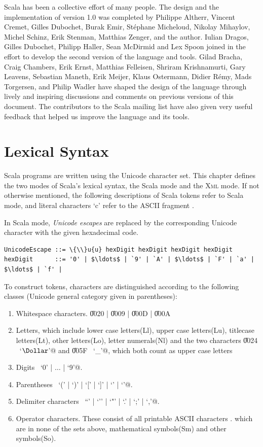 Scala has been a collective effort of many people. The design and the
implementation of version 1.0 was completed by Philippe Altherr,
Vincent Cremet, Gilles Dubochet, Burak Emir, St\'ephane Micheloud,
Nikolay Mihaylov, Michel Schinz, Erik Stenman, Matthias Zenger, and
the author. Iulian Dragos, Gilles Dubochet, Philipp Haller, Sean McDirmid
and Lex Spoon joined in the effort to develop the second version of the
language and tools.  Gilad Bracha, Craig Chambers, Erik Ernst,
Matthias Felleisen, Shriram Krishnamurti, Gary Leavens, Sebastian
Maneth, Erik Meijer, Klaus Ostermann, Didier R\'emy, Mads Torgersen, and Philip Wadler
have shaped the design of the language through lively and inspiring
discussions and comments on previous versions of this document.  The
contributors to the Scala mailing list have also given very useful
feedback that helped us improve the language and its tools.

\chapter{Lexical Syntax}

Scala programs are written using the Unicode character set.
This chapter defines the two modes of Scala's lexical syntax, the
Scala mode and the \textsc{Xml} mode. If not otherwise mentioned, the following 
descriptions of Scala tokens refer to Scala mode, and literal characters `c' refer 
to the ASCII fragment . 

In Scala mode, \textit{Unicode escapes} are replaced by the corresponding
Unicode character with the given hexadecimal code.
\begin{lstlisting}
UnicodeEscape ::= \{\\}u{u} hexDigit hexDigit hexDigit hexDigit
hexDigit      ::= '0' | $\ldots$ | `9' | `A' | $\ldots$ | `F' | `a' | $\ldots$ | `f' |
\end{lstlisting}
To construct tokens, characters are distinguished according to the following classes 
(Unicode general category given in parentheses):
\begin{enumerate}
\item Whitespace characters. \U{0020} | \U{0009} | \U{000D} | \U{000A}
\item Letters, which include lower case letters(Ll), upper case letters(Lu), titlecase letters(Lt), other letters(Lo), letter numerals(Nl) and the 
two characters \U{0024} ~\lstinline@`$\Dollar$'@ and \U{005F} ~\lstinline@`_'@, which
both count as upper case letters
\item Digits ~\lstinline@`0' | $\ldots$ | `9'@.
\item Parentheses ~\lstinline@`(' | `)' | `[' | `]' | `{' | `}'@.
\item Delimiter characters ~\lstinline@``' | `'' | `"' | `.' | `;' | `,'@.
\item Operator characters. These consist of all printable ASCII characters . 
which are in none of the sets above, mathematical symbols(Sm) and other symbols(So).
\end{enumerate}
\newpage
